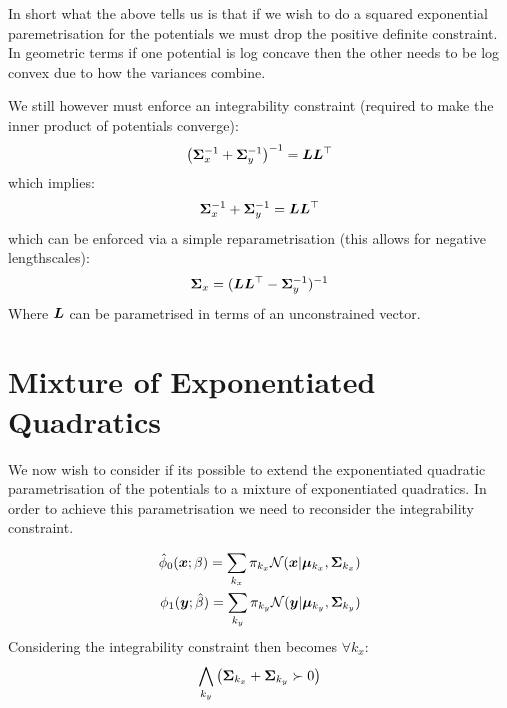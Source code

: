 \documentclass[a4paper,12pt,twoside,openright]{report}
\theoremstyle{definition}
\begin{document}
In short what the above tells us is that if we wish to do a squared exponential paremetrisation for the potentials we must drop the positive definite constraint. In geometric terms if one potential is log concave then the other needs to be log convex due to how the variances combine.

We still however must enforce an integrability constraint (required to make the inner product of potentials converge):
\begin{align*}
\left({\bm{\Sigma}}_x^{-1} +{\bm{\Sigma}}_y^{-1}\right)^{-1} = {\bm{L}}{\bm{L}}^{\top}
\end{align*}
which implies:
\begin{align*}
{\bm{\Sigma}}_x^{-1} +{\bm{\Sigma}}_y^{-1} = {\bm{L}}{\bm{L}}^{\top}
\end{align*}
which can be enforced via a simple reparametrisation (this allows for negative lengthscales):
\begin{align*}
{\bm{\Sigma}}_x = ({\bm{L}}{\bm{L}}^{\top} -{\bm{\Sigma}}_y^{-1})^{-1}
\end{align*}
Where ${\bm{L}}$ can be parametrised in terms of an unconstrained vector.
\section{Mixture of Exponentiated Quadratics}


We now wish to consider if its possible to extend the exponentiated quadratic  parametrisation of the potentials to a mixture of exponentiated quadratics. In order to achieve this parametrisation we need to reconsider the integrability constraint.

\begin{align}
{\hat{\phi}}_0( {\bm{x}} ; \beta) =  \sum_{k_x} \pi_{k_x} {\mathcal{N}}({\bm{x}} | {\bm{\mu}}_{k_x}, {\bm{\Sigma}}_{k_x}) \\
\phi_1( {\bm{y}} ; \hat{\beta}) = \sum_{k_y} \pi_{k_y}  {\mathcal{N}}({\bm{y}} | {\bm{\mu}}_{k_y}, {\bm{\Sigma}}_{k_y}) 
\end{align}
Considering  the integrability constraint then becomes $\forall k_x$:
\begin{align*}
   \bigwedge_{k_y} \left({\bm{\Sigma}}_{k_x} +{\bm{\Sigma}}_{k_y} \succ 0\right) 
\end{align*}
\end{document}
